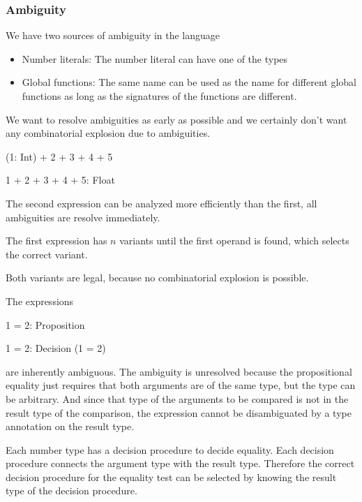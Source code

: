 \vskip 5mm
\subsubsection{Ambiguity}

We have two sources of ambiguity in the language

\begin{itemize}

\item Number literals: The number literal  can have one of the types

\item Global functions: The same name can be used as the name for different
global functions as long as the signatures of the functions are different.

\end{itemize}

We want to resolve ambiguities as early as possible and we certainly don't want
any combinatorial explosion due to ambiguities.

\begin{alba}
    (1: Int) + 2 + 3 + 4 + 5

    1 + 2 + 3 + 4 + 5: Float
\end{alba}

The second expression can be analyzed more efficiently than the first, all
ambiguities are resolve immediately.

The first expression has $n$ variants until the first operand is found, which
selects the correct variant.

Both variants are legal, because no combinatorial explosion is possible.

The expressions

\begin{alba}
    1 = 2: Proposition

    1 = 2: Decision (1 = 2)
\end{alba}

are inherently ambiguous. The ambiguity is unresolved because the propositional
equality \code{(=)} just requires that both arguments are of the same type, but
the type can be arbitrary. And since that type of the arguments to be compared
is not in the result type of the comparison, the expression cannot be
disambiguated by a type annotation on the result type.

Each number type has a decision procedure to decide equality. Each decision
procedure connects the argument type with the result type. Therefore the correct
decision procedure for the equality test can be selected by knowing the result
type of the decision procedure.


